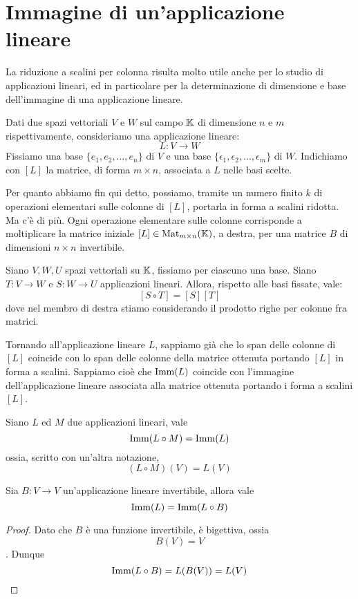 \section{Immagine di un'applicazione lineare}
La riduzione a scalini per colonna risulta molto utile anche per lo
studio di applicazioni lineari, ed in particolare per la
determinazione di dimensione e base dell'immagine di una applicazione
lineare.

Dati due spazi vettoriali $V$ e $W$ sul campo $\mathbb{K}$ di dimensione $n$
e $m$ rispettivamente, consideriamo una applicazione lineare:
\[
	L : V \to W
\]
Fissiamo una base $\{e_1, e_2, \dots, e_n\}$ di $V$ e una base
$\{\epsilon_1, \epsilon_2, \dots, \epsilon_m\}$ di $W$. Indichiamo con $[L]$
la matrice, di forma $m \times n$, associata a $L$ nelle basi scelte.

Per quanto abbiamo fin qui detto, possiamo, tramite un numero finito $k$ di
operazioni elementari sulle colonne di $[L]$, portarla in forma a scalini
ridotta. Ma c'è di più. Ogni operazione elementare sulle colonne corrisponde
a moltiplicare la matrice iniziale $[L] \in \operatorname{Mat}_{m \times n}(\mathbb{K})$,
a destra, per una matrice $B$ di dimensioni $n \times n$ invertibile.

\begin{theorem}
	Siano $V, W, U$ spazi vettoriali su $\mathbb{K}$, fissiamo per ciascuno
	una base. Siano $T : V \to W$ e $S : W \to U$ applicazioni lineari. Allora,
	rispetto alle basi fissate, vale:
	\[
		[S \circ T] = [S][T]
	\]
	dove nel membro di destra stiamo considerando il prodotto righe per colonne
	fra matrici.
\end{theorem}

Tornando all'applicazione lineare $L$, sappiamo già che lo span delle colonne
di $[L]$ coincide con lo span delle colonne della matrice ottenuta portando $[L]$
in forma a scalini. Sappiamo cioè che $\operatorname{Imm}(L)$ coincide con l'immagine
dell'applicazione lineare associata alla matrice ottenuta portando i forma a
scalini $[L]$.

\begin{proposition}
	Siano $L$ ed $M$ due applicazioni lineari, vale
	\[ \operatorname{Imm}(L \circ M) = \operatorname{Imm}(L) \]
	ossia, scritto con un'altra notazione,
	\[ (L \circ M)(V) = L(V) \]
\end{proposition}

\begin{proposition}
	Sia $B : V \to V$ un'applicazione lineare invertibile, allora vale
	\[ \operatorname{Imm}(L) = \operatorname{Imm}(L \circ B) \]
	\begin{proof}
		Dato che $B$ è una funzione invertibile, è bigettiva, ossia
		\[ B(V) = V \]. Dunque
		\[
			\operatorname{Imm}(L \circ B) = L(B(V)) = L(V)
		\]
	\end{proof}
\end{proposition}


